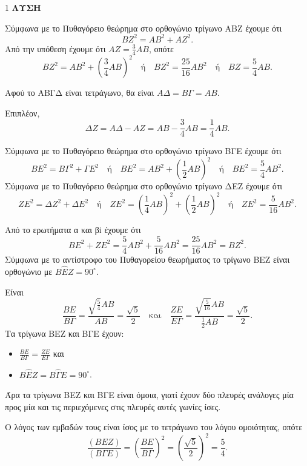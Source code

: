 \begin{ylh}{1}
\noindent\textbf{ΛΥΣΗ}
\begin{alist}
    \item[α)] Σύμφωνα με το Πυθαγόρειο θεώρημα στο ορθογώνιο τρίγωνο ΑΒΖ έχουμε ότι
    \[ BZ^2 = AB^2 + AZ^2. \]
    Από την υπόθεση έχουμε ότι $AZ = \frac{3}{4}AB$, οπότε
    \[ BZ^2 = AB^2 + \left(\frac{3}{4}AB\right)^2 \quad \text{ή} \quad BZ^2 = \frac{25}{16}AB^2 \quad \text{ή} \quad BZ = \frac{5}{4}AB. \]

    \item[β)] Αφού το ΑΒΓΔ είναι τετράγωνο, θα είναι $ΑΔ = ΒΓ = ΑΒ$.
    \par Επιπλέον,
    \[ \Delta Z = A\Delta - AZ = AB - \frac{3}{4}AB = \frac{1}{4}AB. \]
    \begin{rlist}
        \item[i.] Σύμφωνα με το Πυθαγόρειο θεώρημα στο ορθογώνιο τρίγωνο ΒΓΕ έχουμε ότι
        \[ BE^2 = B\Gamma^2 + \Gamma E^2 \quad \text{ή} \quad BE^2 = AB^2 + \left(\frac{1}{2}AB\right)^2 \quad \text{ή} \quad BE^2 = \frac{5}{4}AB^2. \]
        Σύμφωνα με το Πυθαγόρειο θεώρημα στο ορθογώνιο τρίγωνο ΔΕΖ έχουμε ότι
        \[ ZE^2 = \Delta Z^2 + \Delta E^2 \quad \text{ή} \quad ZE^2 = \left(\frac{1}{4}AB\right)^2 + \left(\frac{1}{2}AB\right)^2 \quad \text{ή} \quad ZE^2 = \frac{5}{16}AB^2. \]

        \item[ii.] Από το ερωτήματα α και βi έχουμε ότι
        \[ BE^2 + ZE^2 = \frac{5}{4}AB^2 + \frac{5}{16}AB^2 = \frac{25}{16}AB^2 = BZ^2. \]
        Σύμφωνα με το αντίστροφο του Πυθαγορείου θεωρήματος το τρίγωνο ΒΕΖ είναι ορθογώνιο με $B\hat{E}Z = 90^\circ$.
    \end{rlist}

    \item[γ)] Είναι
    \[ \frac{BE}{B\Gamma} = \frac{\sqrt{\frac{5}{4}}AB}{AB} = \frac{\sqrt{5}}{2} \quad \text{και} \quad \frac{ZE}{E\Gamma} = \frac{\sqrt{\frac{5}{16}}AB}{\frac{1}{2}AB} = \frac{\sqrt{5}}{2}. \]
    Τα τρίγωνα ΒΕΖ και ΒΓΕ έχουν:
    \begin{itemize}
        \item $\displaystyle \frac{BE}{B\Gamma} = \frac{ZE}{E\Gamma}$ και
        \item $B\hat{E}Z = B\hat{\Gamma}E = 90^\circ$.
    \end{itemize}
    Άρα τα τρίγωνα ΒΕΖ και ΒΓΕ είναι όμοια, γιατί έχουν δύο πλευρές ανάλογες μία προς μία και τις περιεχόμενες στις πλευρές αυτές γωνίες ίσες.
    \par Ο λόγος των εμβαδών τους είναι ίσος με το τετράγωνο του λόγου ομοιότητας, οπότε
    \[ \frac{(BEZ)}{(B\Gamma E)} = \left(\frac{BE}{B\Gamma}\right)^2 = \left(\frac{\sqrt{5}}{2}\right)^2 = \frac{5}{4}. \]
\end{alist}
\end{ylh}